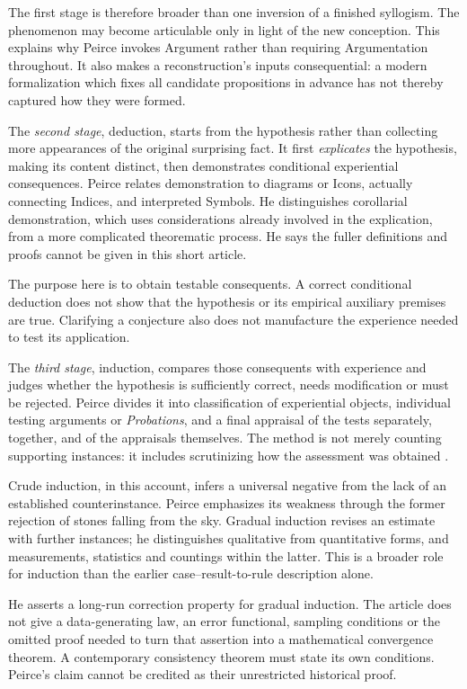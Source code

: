 The first stage is therefore broader than one inversion of a finished
syllogism. The phenomenon may become articulable only in light of the
new conception. This explains why Peirce invokes Argument rather than
requiring Argumentation throughout. It also makes a reconstruction's
inputs consequential: a modern formalization which fixes all candidate
propositions in advance has not thereby captured how they were formed.

The \emph{second stage}, deduction, starts from the hypothesis rather
than collecting more appearances of the original surprising fact.
It first \emph{explicates} the hypothesis, making its content distinct,
then demonstrates conditional experiential consequences. Peirce relates
demonstration to diagrams or Icons, actually connecting Indices, and
interpreted Symbols. He distinguishes corollarial demonstration, which
uses considerations already involved in the explication, from a more
complicated theorematic process. He says the fuller definitions and
proofs cannot be given in this short article.

The purpose here is to obtain testable consequents. A correct conditional
deduction does not show that the hypothesis or its empirical auxiliary
premises are true. Clarifying a conjecture also does not manufacture
the experience needed to test its application.

The \emph{third stage}, induction, compares those consequents with
experience and judges whether the hypothesis is sufficiently correct,
needs modification or must be rejected. Peirce divides it into
classification of experiential objects, individual testing arguments
or \emph{Probations}, and a final appraisal of the tests separately,
together, and of the appraisals themselves. The method is not merely
counting supporting instances: it includes scrutinizing how the
assessment was obtained \parencite[sec.~III]{Peirce1908NeglectedPrimary}.

Crude induction, in this account, infers a universal negative from
the lack of an established counterinstance. Peirce emphasizes its
weakness through the former rejection of stones falling from the sky.
Gradual induction revises an estimate with further instances; he
distinguishes qualitative from quantitative forms, and measurements,
statistics and countings within the latter. This is a broader role
for induction than the earlier case--result-to-rule description alone.

He asserts a long-run correction property for gradual induction.
The article does not give a data-generating law, an error functional,
sampling conditions or the omitted proof needed to turn that assertion
into a mathematical convergence theorem. A contemporary consistency
theorem must state its own conditions. Peirce's claim cannot be credited
as their unrestricted historical proof.

